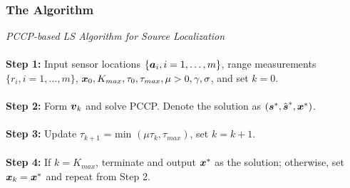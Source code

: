 \documentclass [t] {beamer} %
\begin{document}
\begin{frame}
\frametitle{The Algorithm}
{\large \textit{PCCP-based LS Algorithm for Source Localization}}
\\~\\
\textbf{Step 1:} Input sensor locations $\{\mbox{\boldmath$a$}_i, i = 1,\ldots,m\}$, range measurements $\{r_i, i = 1, \ldots, m\}$, $\mbox{\boldmath$x$}_0, K_{max}, \tau_0, \tau_{max}, \mu > 0, \gamma, \sigma$, and set $k = 0$. 
\\~\\
\textbf{Step 2:} Form  $\mbox{\boldmath$v$}_k$ and solve PCCP. Denote the solution as  $(\mbox{\boldmath$s$}^*, \hat{\mbox{\boldmath$s$}}^*, \mbox{\boldmath$x$}^*)$. 
\\~\\
\textbf{Step 3:} Update  $\tau_{k+1} $ = min $(\mu\tau_k, \tau_{max})$, set $k = k+1$. 
\\~\\
\textbf{Step 4:} If $k = K_{max}$, terminate and output $\mbox{\boldmath$x$}^*$ as the solution; otherwise, set $\mbox{\boldmath$x$}_k = \mbox{\boldmath$x$}^*$ and repeat from Step 2. 
\end{frame}



%
%


%
%
%



\end{document}
